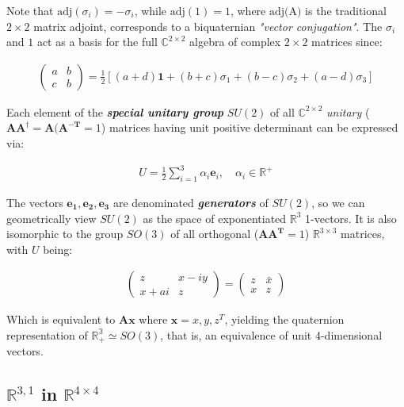 \documentclass[a4paper]{book}
\numberwithin{equation}{chapter}
\begin{document}
Note that $\text{adj}(\sigma_i) = -\sigma_i$, while $\text{adj}(1) = 1$,
where $\text{adj(A)}$ is the traditional $2\times 2$ matrix adjoint, corresponds
to a biquaternian \emph{"vector conjugation"}. The $\sigma_i$ and $1$ act as a basis for the 
full $\mathbb{C}^{2\times 2}$ algebra
of complex $2\times 2$ matrices since:

\begin{align*}
\begin{pmatrix}
 a &b \\
 c &b
\end{pmatrix}
=
\frac{1}{2}\left[ (a+d)\mathbf{1}+(b+c)\sigma_1+(b-c)\sigma_2+(a-d)\sigma_3  \right ]
\end{align*}

Each element of the \emph{\textbf{special unitary group}} $SU(2)$ of all
$\mathbb{C}^{2\times 2}$ \emph{unitary} ($\mathbf{AA^{\dagger}=A(A^{-T}}=1$) matrices
having unit positive determinant can be expressed via:

\begin{align*}
    U= \frac{1}{2} \sum_{i=1}^3 \alpha_i \mathbf{e}_i, \quad \alpha_i \in \mathbb{R}^+
\end{align*}

The vectors $\mathbf{e_1, e_2, e_3}$ are denominated \emph{\textbf{generators}}
of $SU(2)$, so we can geometrically view $SU(2)$ as the space of exponentiated
$\mathbb{R}^3$ 1-vectors. It is also isomorphic to the group $SO(3)$ of all
orthogonal ($\mathbf{AA^T}=1$) $\mathbb{R}^{3\times 3}$ matrices, with $U$ being:

\begin{align*}
    \begin{pmatrix}
 z &x-iy \\
 x+ai &z
\end{pmatrix}
=
\begin{pmatrix}
 z &\bar{x} \\
 x &z
\end{pmatrix}
\end{align*}

\vspace{\baselineskip}

Which is equivalent to $\mathbf{Ax}$ where $\mathbf{x} = {x,y,z}^T$, yielding
the quaternion representation of $\mathbb{R^3_+} \simeq SO(3)$, that is, an
equivalence of unit 4-dimensional vectors.

    
    \subsection{$\mathbb{R}^{3,1}$ in $\mathbb{R}^{4 \times 4}$}
\end{document}

